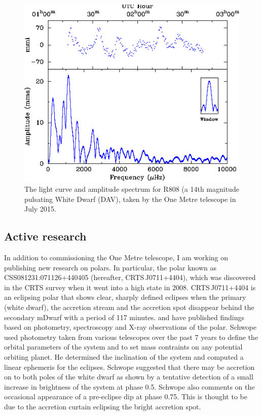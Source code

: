 \documentclass[a4paper,fleqn,usenatbib]{mnras}
\begin{document}
\begin{figure}
	\includegraphics[width=\columnwidth]{images/r808.pdf}
    \caption{The light curve and amplitude spectrum for R808 (a 14th magnitude pulsating White Dwarf (DAV), taken by the One Metre telescope in July 2015.}
    \label{fig:r808}
\end{figure}
 
\subsection{Active research}
In addition to commissioning the One Metre telescope, I am working on publishing new research on polars. In particular, the polar known as CSS081231:071126+440405 (hereafter,  CRTS\,J0711+4404), which was discovered in the CRTS survey when it went into a high state in 2008.  CRTS\,J0711+4404 is an eclipsing polar that shows  clear, sharply defined eclipses when the primary (white dwarf), the accretion stream and the accretion spot disappear behind the secondary mDwarf with a period of 117 minutes.  \citet{Schwope2015} and \citet{Worpel2015} have published findings based on photometry, spectroscopy and X-ray observations of the polar. Schwope used photometry taken from various telescopes over the past 7 years to define the orbital parameters of the system and to set mass contraints on any potential orbiting planet. He determined the inclination of the system and computed a linear ephemeris for the eclipses. Schwope suggested that there may be accretion on to both poles of the white dwarf as shown by a tentative detection of a small increase in brightness of the system at phase 0.5. Schwope also comments on the occasional appearance of a pre-eclipse dip at phase 0.75. This is thought to be due to the accretion curtain eclipsing the bright accretion spot.  
\end{document}
